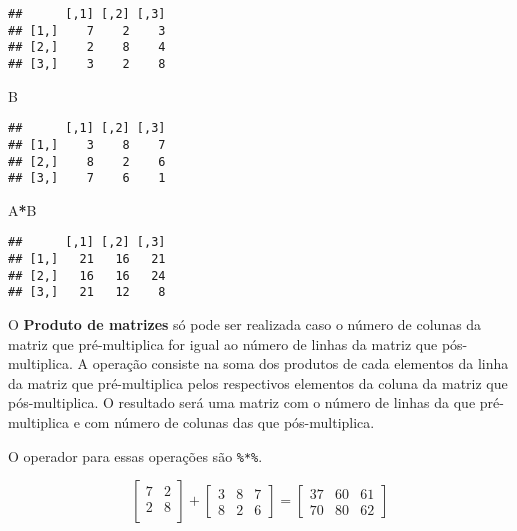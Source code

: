 \documentclass[
]{book}
\newenvironment{Shaded}{\begin{snugshade}}{\end{snugshade}}
\newcommand{\NormalTok}[1]{#1}
\newcommand{\OperatorTok}[1]{\textcolor[rgb]{0.81,0.36,0.00}{\textbf{#1}}}
\begin{document}
\begin{verbatim}
##      [,1] [,2] [,3]
## [1,]    7    2    3
## [2,]    2    8    4
## [3,]    3    2    8
\end{verbatim}

\begin{Shaded}
\begin{Highlighting}[]
\NormalTok{B}
\end{Highlighting}
\end{Shaded}

\begin{verbatim}
##      [,1] [,2] [,3]
## [1,]    3    8    7
## [2,]    8    2    6
## [3,]    7    6    1
\end{verbatim}

\begin{Shaded}
\begin{Highlighting}[]
\NormalTok{A}\OperatorTok{*}\NormalTok{B}
\end{Highlighting}
\end{Shaded}

\begin{verbatim}
##      [,1] [,2] [,3]
## [1,]   21   16   21
## [2,]   16   16   24
## [3,]   21   12    8
\end{verbatim}

O \textbf{Produto de matrizes} só pode ser realizada caso o número de colunas da matriz que pré-multiplica for igual ao número de linhas da matriz que pós-multiplica. A operação consiste na soma dos produtos de cada elementos da linha da matriz que pré-multiplica pelos respectivos elementos da coluna da matriz que pós-multiplica. O resultado será uma matriz com o número de linhas da que pré-multiplica e com número de colunas das que pós-multiplica.

O operador para essas operações são \texttt{\%*\%}.

\begin{equation*}
\begin{bmatrix}
7 & 2 \\
2 & 8 \\
\end{bmatrix} + 
\begin{bmatrix}
3 & 8 & 7\\
8 & 2 & 6
\end{bmatrix} = 
\begin{bmatrix}
37 & 60 & 61\\
70 & 80 & 62
\end{bmatrix}
\end{equation*}
\end{document}
